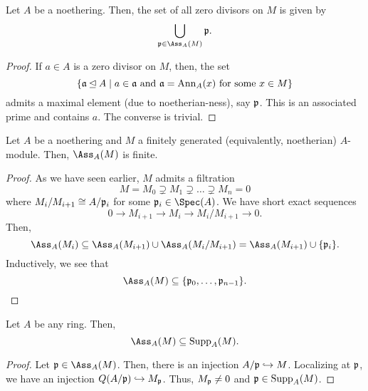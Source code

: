 \begin{lemma}
    Let $A$ be a noethering. Then, the set of all zero divisors on $M$ is given by 
    \begin{equation*}
        \bigcup_{\frakp\in\Ass_A(M)}\frakp.
    \end{equation*}
\end{lemma}
\begin{proof}
    If $a\in A$ is a zero divisor on $M$, then, the set 
    \begin{equation*}
        \{\mathfrak a\unlhd A\mid a\in\mathfrak a\text{ and }\mathfrak a = \operatorname{Ann}_A(x)\text{ for some }x\in M\}
    \end{equation*}
    admits a maximal element (due to noetherian-ness), say $\mathfrak p$. This is an associated prime and contains $a$. The converse is trivial.
\end{proof}

\begin{lemma}
    Let $A$ be a noethering and $M$ a finitely generated (equivalently, noetherian) $A$-module. Then, $\Ass_A(M)$ is finite.
\end{lemma}
\begin{proof}
    As we have seen earlier, $M$ admits a filtration 
    \begin{equation*}
        M = M_0\supsetneq M_1\supsetneq\dots\supsetneq M_n = 0
    \end{equation*}
    where $M_i/M_{i + 1}\cong A/\mathfrak p_i$ for some $\frakp_i\in\Spec(A)$. We have short exact sequences 
    \begin{equation*}
        0\longrightarrow M_{i + 1}\longrightarrow M_i\longrightarrow M_i/M_{i + 1}\longrightarrow 0.
    \end{equation*}
    Then, 
    \begin{equation*}
        \Ass_A(M_i)\subseteq\Ass_A(M_{i + 1})\cup\Ass_A(M_i/M_{i + 1}) = \Ass_A(M_{i + 1})\cup\{\frakp_i\}.
    \end{equation*}
    Inductively, we see that 
    \begin{equation*}
        \Ass_A(M)\subseteq\{\frakp_0,\dots,\frakp_{n - 1}\}.\qedhere
    \end{equation*}
\end{proof}

\begin{lemma}
    Let $A$ be any ring. Then,
    \begin{equation*}
        \Ass_A(M)\subseteq\Supp_A(M).
    \end{equation*}
\end{lemma}
\begin{proof}
    Let $\frakp\in\Ass_A(M)$. Then, there is an injection $A/\mathfrak p\hookrightarrow M$. Localizing at $\mathfrak p$, we have an injection $Q(A/\mathfrak p)\hookrightarrow M_\mathfrak p$. Thus, $M_\mathfrak p\ne 0$ and $\mathfrak p\in\operatorname{Supp}_A(M)$.
\end{proof}

